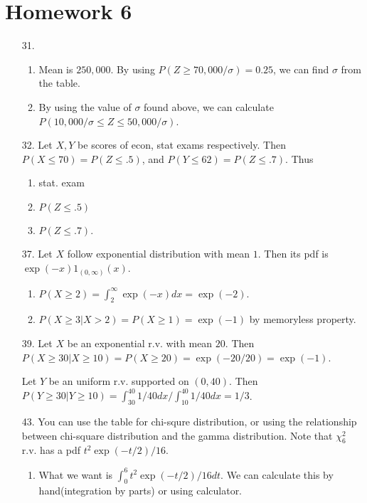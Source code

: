 \documentclass{article}
\begin{document}
\section*{Homework 6}
\begin{enumerate}
	\item[31.]
		\begin{enumerate}[label = (\alph*)]
			\item Mean is $250,000$.
				By using $P(Z \ge 70,000/\sigma) = 0.25$, we can find $\sigma$ from the table.

			\item By using the value of $\sigma$ found above, we can calculate
				$P(10,000/ \sigma \le Z \le 50,000/\sigma)$.
		\end{enumerate}

	\item[32.]
		Let $X, Y$ be scores of econ, stat exams respectively.
		Then $P(X \le 70) = P(Z \le .5)$, and $P(Y \le 62) = P(Z \le .7)$.
		Thus
		\begin{enumerate}[label = (\alph*)]
			\item stat. exam
			\item $P(Z \le .5)$
			\item $P(Z \le .7)$.
		\end{enumerate}

	\item[37.]
		Let $X$ follow exponential distribution with mean $1$.
		Then its pdf is $\exp(-x)1_{\left( 0, \infty \right)}(x)$.
		\begin{enumerate}[label = (\alph*)]
			\item $P(X \ge 2) = \int_2^\infty\exp(-x)dx = \exp(-2).$
			\item $P(X \ge 3 \lvert X>2) = P(X \ge 1) = \exp(-1)$ by memoryless property.
		\end{enumerate}

	\item[39.]
		Let $X$ be an exponential r.v. with mean $20$.
		Then $P(X \ge 30 \lvert X \ge 10) = P(X \ge 20) = \exp(-20/20) = \exp(-1)$.

		Let $Y$ be an uniform r.v. supported on $(0, 40)$.
		Then $P(Y \ge 30 \lvert Y \ge 10) = \int_{30}^{40}1/40 dx / \int_{10}^{40} 1/40 dx = 1/3$.

	\item[43.]
		You can use the table for chi-squre distribution, or using the relationship between chi-square distribution and the gamma distribution.
		Note that $\chi_6^2$ r.v. has a pdf $t^2 \exp(-t/2)/16$.
		\begin{enumerate}[label = (\alph*)]
			\item What we want is $\int_0^6 t^2 \exp(-t/2) /16 dt$.
				We can calculate this by hand(integration by parts) or using calculator.


\end{enumerate}
\end{enumerate}
\end{document}
